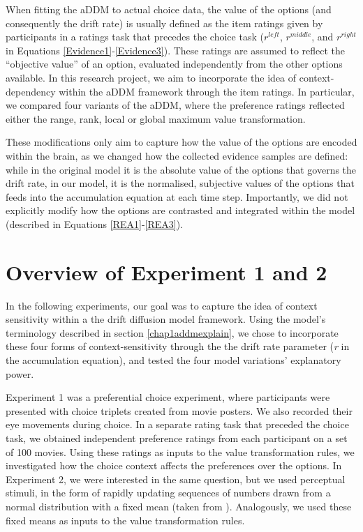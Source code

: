 \documentclass[11pt,a4paper]{article}
\begin{document}
When fitting the aDDM to actual choice data, the value of the options (and consequently the drift rate) is usually defined as the item ratings given by participants in a ratings task that precedes the choice task ($r^{left}$, $r^{middle}$, and $r^{right}$ in Equations \ref{Evidence1}-\ref{Evidence3}). These ratings are assumed to reflect the “objective value” of an option, evaluated independently from the other options available. In this research project, we aim to incorporate the idea of context-dependency within the aDDM framework through the item ratings. In particular, we compared four variants of the aDDM, where the preference ratings reflected either the range, rank, local or global maximum value transformation. 

These modifications only aim to capture how the value of the options are encoded within the brain, as we changed how the collected evidence samples are defined: while in the original model it is the absolute value of the options that governs the drift rate, in our model, it is the normalised, subjective values of the options that feeds into the accumulation equation at each time step. Importantly, we did not explicitly modify how the options are contrasted and integrated within the model (described in Equations \ref{REA1}-\ref{REA3}).



\section{Overview of Experiment 1 and 2}

In the following experiments, our goal was to capture the idea of context sensitivity within a the drift diffusion model framework. Using the model's terminology described in section \ref{chap1addmexplain}, we chose to incorporate these four forms of context-sensitivity through the the drift rate parameter (\textit{r} in the accumulation equation), and tested the four model variations' explanatory power.

Experiment 1 was a preferential choice experiment, where participants were presented with choice triplets created from movie posters. We also recorded their eye movements during choice. In a separate rating task that preceded the choice task, we obtained independent preference ratings from each participant on a set of 100 movies. Using these ratings as inputs to the value transformation rules, we investigated how the choice context affects the preferences over the options. In Experiment 2, we were interested in the same question, but we used perceptual stimuli, in the form of rapidly updating sequences of numbers drawn from a normal distribution with a fixed mean (taken from ). Analogously, we used these fixed means as inputs to the value transformation rules.
\end{document}
